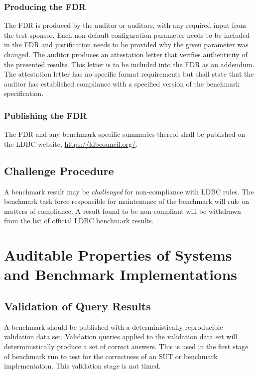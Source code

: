 \subsubsection{Producing the FDR}
The FDR is produced by the auditor or auditors, with any required input from the test sponsor. Each non-default configuration parameter needs to be included in the FDR and justification needs to be provided why the given parameter was changed.
The auditor produces an attestation letter that verifies authenticity of the presented results. This letter is to be included into the FDR as an addendum. The attestation letter has no specific format requirements but shall state that the auditor has established compliance with a specified version of the benchmark specification.

\subsubsection{Publishing the FDR}
The FDR and any benchmark specific summaries thereof shall be published on the LDBC website, \url{https://ldbcouncil.org/}.

\subsection{Challenge Procedure}

A benchmark result may be \emph{challenged} for non-compliance with LDBC rules. The benchmark task force responsible for maintenance of the benchmark will rule on matters of compliance. A result found to be non-compliant will be withdrawn from the list of official LDBC benchmark results.


\section{Auditable Properties of Systems and Benchmark Implementations}


\subsection{Validation of Query Results}
\label{sec:validation}
A benchmark should be published with a deterministically reproducible validation data set. Validation queries applied to the validation data set will deterministically produce a set of correct answers. This is used in the first stage of benchmark run to test for the correctness of an SUT or benchmark implementation. This validation stage is not timed.

